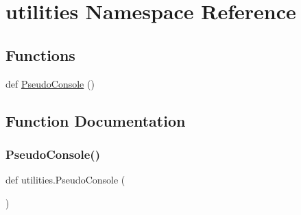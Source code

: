 \hypertarget{namespaceutilities}{}\section{utilities Namespace Reference}
\label{namespaceutilities}
\subsection*{Functions}
\begin{DoxyCompactItemize}
\item 
def \hyperlink{namespaceutilities_a85150e8e264f76b149785770210a7f1a}{Pseudo\+Console} ()
\end{DoxyCompactItemize}


\subsection{Function Documentation}
\mbox{\label{namespaceutilities_a85150e8e264f76b149785770210a7f1a}} 
\subsubsection{\texorpdfstring{Pseudo\+Console()}{PseudoConsole()}}
{\footnotesize\ttfamily def utilities.\+Pseudo\+Console (\begin{DoxyParamCaption}{ }\end{DoxyParamCaption})}

